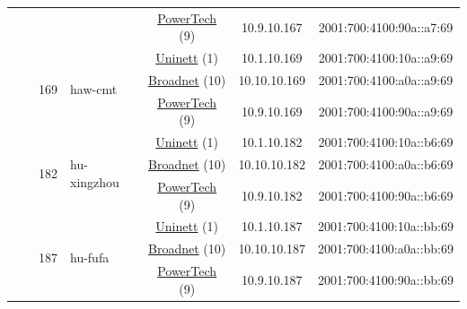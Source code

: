 \begin{small}
\begin{center}
\begin{longtable}{|c|c|c|c|c|c|c|c|}
  &  &  &  & \multicolumn{2}{|c|}{\tiny{\href{http://www.powertech.no}{PowerTech} (9)}} & \tiny{10.9.10.167} & \tiny{2001:700:4100:90a::a7:69} \\* \cline{3-3}\cline{4-4}\cline{5-5}\cline{6-6}\cline{7-7}\cline{8-8}
  &  & \multirow{3}{*}{\tiny{169}} & \multicolumn{1}{|l|}{\multirow{3}{*}{\tiny{haw-cmt}}} & \multicolumn{2}{|c|}{\tiny{\href{https://www.uninett.no}{Uninett} (1)}} & \tiny{10.1.10.169} & \tiny{2001:700:4100:10a::a9:69} \\* \cline{5-5}\cline{6-6}\cline{7-7}\cline{8-8}
  &  &  &  & \multicolumn{2}{|c|}{\tiny{\href{https://www.broadnet.no}{Broadnet} (10)}} & \tiny{10.10.10.169} & \tiny{2001:700:4100:a0a::a9:69} \\* \cline{5-5}\cline{6-6}\cline{7-7}\cline{8-8}
  &  &  &  & \multicolumn{2}{|c|}{\tiny{\href{http://www.powertech.no}{PowerTech} (9)}} & \tiny{10.9.10.169} & \tiny{2001:700:4100:90a::a9:69} \\* \cline{3-3}\cline{4-4}\cline{5-5}\cline{6-6}\cline{7-7}\cline{8-8}
  &  & \multirow{3}{*}{\tiny{182}} & \multicolumn{1}{|l|}{\multirow{3}{*}{\tiny{hu-xingzhou}}} & \multicolumn{2}{|c|}{\tiny{\href{https://www.uninett.no}{Uninett} (1)}} & \tiny{10.1.10.182} & \tiny{2001:700:4100:10a::b6:69} \\* \cline{5-5}\cline{6-6}\cline{7-7}\cline{8-8}
  &  &  &  & \multicolumn{2}{|c|}{\tiny{\href{https://www.broadnet.no}{Broadnet} (10)}} & \tiny{10.10.10.182} & \tiny{2001:700:4100:a0a::b6:69} \\* \cline{5-5}\cline{6-6}\cline{7-7}\cline{8-8}
  &  &  &  & \multicolumn{2}{|c|}{\tiny{\href{http://www.powertech.no}{PowerTech} (9)}} & \tiny{10.9.10.182} & \tiny{2001:700:4100:90a::b6:69} \\* \cline{3-3}\cline{4-4}\cline{5-5}\cline{6-6}\cline{7-7}\cline{8-8}
  &  & \multirow{3}{*}{\tiny{187}} & \multicolumn{1}{|l|}{\multirow{3}{*}{\tiny{hu-fufa}}} & \multicolumn{2}{|c|}{\tiny{\href{https://www.uninett.no}{Uninett} (1)}} & \tiny{10.1.10.187} & \tiny{2001:700:4100:10a::bb:69} \\* \cline{5-5}\cline{6-6}\cline{7-7}\cline{8-8}
  &  &  &  & \multicolumn{2}{|c|}{\tiny{\href{https://www.broadnet.no}{Broadnet} (10)}} & \tiny{10.10.10.187} & \tiny{2001:700:4100:a0a::bb:69} \\* \cline{5-5}\cline{6-6}\cline{7-7}\cline{8-8}
  &  &  &  & \multicolumn{2}{|c|}{\tiny{\href{http://www.powertech.no}{PowerTech} (9)}} & \tiny{10.9.10.187} & \tiny{2001:700:4100:90a::bb:69} \\ \hline
\end{longtable}
\end{center}
\end{small}



